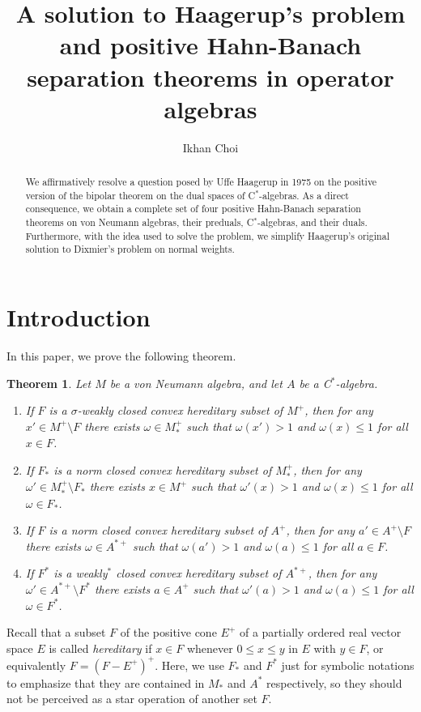\documentclass[noamsfonts,a4paper,10pt]{amsart}
\title[Positive Hahn-Banach separation theorems]{A solution to Haagerup's problem and positive Hahn-Banach separation theorems in operator algebras}
\author[I. Choi]{Ikhan Choi}
\theoremstyle{plain}
\newtheorem*{theorem*}{Theorem}
\theoremstyle{definition}
\begin{document}
\begin{abstract}
We affirmatively resolve a question posed by Uffe Haagerup in 1975 on the positive version of the bipolar theorem on the dual spaces of C$^*$-algebras.
As a direct consequence, we obtain a complete set of four positive Hahn-Banach separation theorems on von Neumann algebras, their preduals, C$^*$-algebras, and their duals.
Furthermore, with the idea used to solve the problem, we simplify Haagerup's original solution to Dixmier's problem on normal weights.
\end{abstract}

\maketitle

\section{Introduction}

In this paper, we prove the following theorem.
\begin{theorem*}
Let $M$ be a von Neumann algebra, and let $A$ be a C$^*$-algebra.
\begin{enumerate}
\item[(1)] If $F$ is a $\sigma$-weakly closed convex hereditary subset of $M^+$, then for any $x'\in M^+\setminus F$ there exists $\omega\in M_*^+$ such that $\omega(x')>1$ and $\omega(x)\le1$ for all $x\in F$.
\item[(2)] If $F_*$ is a norm closed convex hereditary subset of $M_*^+$, then for any $\omega'\in M_*^+\setminus F_*$ there exists $x\in M^+$ such that $\omega'(x)>1$ and $\omega(x)\le1$ for all $\omega\in F_*$.
\item[(3)] If $F$ is a norm closed convex hereditary subset of $A^+$, then for any $a'\in A^+\setminus F$ there exists $\omega\in A^{*+}$ such that $\omega(a')>1$ and $\omega(a)\le1$ for all $a\in F$.
\item[(4)] If $F^*$ is a weakly$^*$ closed convex hereditary subset of $A^{*+}$, then for any $\omega'\in A^{*+}\setminus F^*$ there exists $a\in A^+$ such that $\omega'(a)>1$ and $\omega(a)\le1$ for all $\omega\in F^*$.
\end{enumerate}
\end{theorem*}
\noindent Recall that a subset $F$ of the positive cone $E^+$ of a partially ordered real vector space $E$ is called \emph{hereditary} if $x\in F$ whenever $0\le x\le y$ in $E$ with $y\in F$, or equivalently $F=(F-E^+)^+$.
Here, we use $F_*$ and $F^*$ just for symbolic notations to emphasize that they are contained in $M_*$ and $A^*$ respectively, so they should not be perceived as a star operation of another set $F$.
\end{document}
